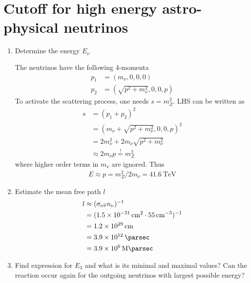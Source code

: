 \section{Cutoff for high energy astro-physical neutrinos}
\begin{enumerate}[label=(\alph*)]
   \item Determine the energy $E_\nu$

      The neutrinos have the following 4-momenta
      \begin{align*}
         p_1 &= (m_\nu, 0, 0, 0)  \\
         p_2 &= (\sqrt{p^2 + m_\nu^2}, 0, 0, p)
      \end{align*}
      To activate the scattering process, one needs $s = m_Z^2$.  LHS can be written as
      \begin{align*}
         s &= (p_1 + p_2)^2 \\
           &= (m_\nu + \sqrt{p^2 + m_\nu^2}, 0, 0, p)^2 \\
           &= 2m_\nu^2 +2m_\nu \sqrt{p^2 + m_\nu^2} \\
           &\approx 2 m_\nu p
           \stackrel{!}= m_Z^2
      \end{align*}
      where higher order terms in $m_\nu$ are ignored.
      Thus
      \begin{align}
         E \approx p = m^2_Z / 2m_\nu =  \SI{41.6}{\tera \eV}
      \end{align}
   \item Estimate the mean free path $l$
      \begin{align*}
         l &\approx (\sigma_{\nu \overline{\nu}} n_\nu )^{-1} \\
           &= (\SI{1.5e-31}{\cm \tothe{2}} \cdot \SI{55}{\cm \tothe{-3}})^{-1} \\
           &= \SI{1.2e29}{\cm}  \\
           &= \SI{3.9e12}{\parsec} \\
           &= \SI{3.9e6}{\mega \parsec}
      \end{align*}
   \item Find expression for $E_3$ and what is its minimal and maximal values? Can the reaction occur again for the outgoing neutrinos with largest possible energy?


\end{enumerate}
